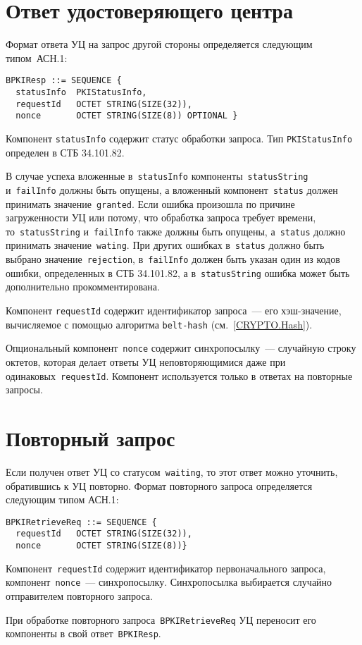 \section{Ответ удостоверяющего центра}\label{FMT.BPKIResp}

Формат ответа УЦ на запрос другой стороны определяется следующим типом~АСН.1:
\begin{verbatim}
BPKIResp ::= SEQUENCE { 
  statusInfo  PKIStatusInfo,
  requestId   OCTET STRING(SIZE(32)),
  nonce       OCTET STRING(SIZE(8)) OPTIONAL }
\end{verbatim}

Компонент \texttt{statusInfo} содержит статус обработки запроса.
Тип \texttt{PKIStatusInfo} определен в СТБ 34.101.82. 

В случае успеха вложенные в~\texttt{statusInfo} 
компоненты~\texttt{statusString} 
и~\texttt{failInfo} должны быть опущены, а вложенный
компонент~\texttt{status} должен принимать значение~\texttt{granted}.
%
Если ошибка произошла по причине загруженности УЦ или потому, 
что обработка запроса требует времени, 
то~\texttt{statusString} и~\texttt{failInfo} также должны быть опущены, 
а~\texttt{status} должно принимать значение~\texttt{wating}.
%
При других ошибках в~\texttt{status} должно быть выбрано 
значение~\texttt{rejection}, в~\texttt{failInfo} должен быть указан один 
из кодов ошибки, определенных в СТБ 34.101.82, а в~\texttt{statusString} 
ошибка может быть дополнительно прокомментирована.

Компонент \texttt{requestId} содержит идентификатор запроса~--- 
его хэш-значение, вычисляемое с помощью алгоритма \texttt{belt-hash} 
(см.~\ref{CRYPTO.Hash}). 

Опциональный компонент~\texttt{nonce} содержит синхропосылку~---
случайную строку октетов, которая делает ответы УЦ неповторяющимися даже 
при одинаковых~\texttt{requestId}. Компонент используется только в ответах
на повторные запросы.

\section{Повторный запрос}\label{FMT.BPKIRetrieveReq}

Если получен ответ УЦ со статусом~\texttt{waiting}, то этот ответ можно 
уточнить, обратившись к УЦ повторно. Формат повторного запроса 
определяется следующим типом АСН.1:
\begin{verbatim}
BPKIRetrieveReq ::= SEQUENCE { 
  requestId   OCTET STRING(SIZE(32)),
  nonce       OCTET STRING(SIZE(8))}
\end{verbatim}

Компонент~\texttt{requestId} содержит идентификатор первоначального 
запроса, компонент~\texttt{nonce}~--- синхропосылку. Синхропосылка 
выбирается случайно отправителем повторного запроса. 

При обработке повторного запроса~\texttt{BPKIRetrieveReq} УЦ
переносит его компоненты в свой ответ~\texttt{BPKIResp}.

